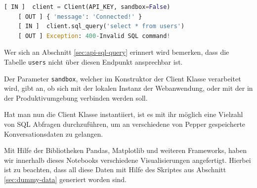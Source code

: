\begin{lstlisting}[language=Python]
    [ IN ]  client = Client(API_KEY, sandbox=False)
    [ OUT ] { 'message': 'Connected!' }
    [ IN ]  client.sql_query('select * from users')
    [ OUT ] Exception: 400-Invalid SQL command!
\end{lstlisting}

Wer sich an Abschnitt \ref{sec:api-sql-query} erinnert wird bemerken, dass die Tabelle \verb|users| nicht über diesen Endpunkt ansprechbar ist.

Der Parameter \verb|sandbox|, welcher im Konstruktor der Client Klasse verarbeitet wird, gibt an, ob sich mit der lokalen Instanz der Webanwendung, oder mit der in der Produktivumgebung verbinden werden soll.

Hat man nun die Client Klasse instantiiert, ist es mit ihr möglich eine Vielzahl von SQL Abfragen durchzuführen, um an verschiedene von Pepper gespeicherte Konversationsdaten zu gelangen.

Mit Hilfe der Bibliotheken Pandas, Matplotlib und weiteren Frameworks, haben wir innerhalb dieses Notebooks verschiedene Visualisierungen angefertigt. Hierbei ist zu beachten, dass all diese Daten mit Hilfe des Skriptes aus Abschnitt \ref{sec:dummy-data} generiert worden sind.\\

